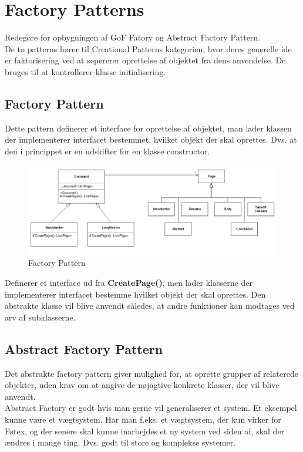\documentclass[../report.tex]{subfiles}
\begin{document}
\section{Factory Patterns}
Redegøre for opbygningen af GoF Fatory og Abstract Factory Pattern.
\\

De to patterns hører til Creational Patterns kategorien, hvor deres generelle ide er faktorisering ved at sepererer oprettelse af objektet fra dens anvendelse. De bruges til at kontrollerer klasse initialisering.

\subsection*{Factory Pattern}
Dette pattern definerer et interface for oprettelse af objektet, man lader klassen der implementerer interfacet bestemmet, hvilket objekt der skal oprettes. Dvs. at den i princippet er en udskifter for en klasse constructor.

\begin{figure}[H]
    \centering
    \includegraphics[width = \textwidth]{pics/factory_pattern.PNG}
    \caption{Factory Pattern}
    \label{fig:factory_pattern}
\end{figure}

Definerer et interface ud fra \textbf{CreatePage()}, men lader klasserne der implementerer interfacet bestemme hvilket objekt der skal oprettes. Den abstrakte klasse vil blive anvendt således, at andre funktioner kan modtages ved arv af subklasserne.

\subsection*{Abstract Factory Pattern}
Det abstrakte factory pattern giver mulighed for, at oprette grupper af relaterede objekter, uden krav om at angive de nøjagtive konkrete klasser, der vil blive anvendt.
\\

Abstract Factory er godt hvis man gerne vil generaliserer et system. Et eksempel kunne være et vægtsystem. Har man f.eks. et vægtsystem, der kun virker for Føtex, og der senere skal kunne inarbejdes et ny system ved siden af, skal der ændres i mange ting. Dvs. godt til store og komplekse systemer.
\end{document}
